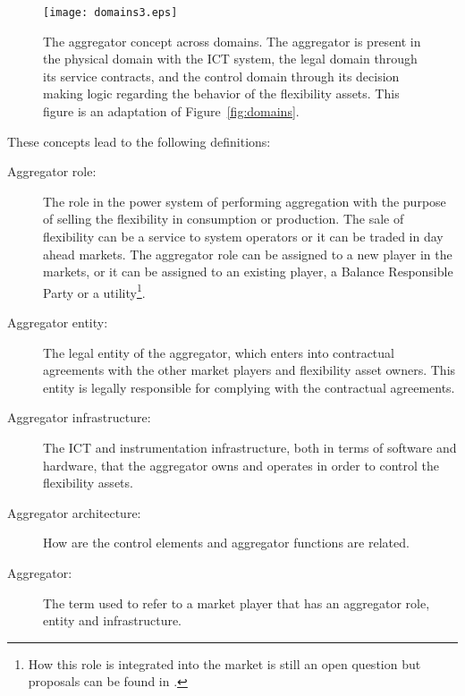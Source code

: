 \begin{figure}[htbp!]
\centering
\texttt{[image: domains3.eps]}
\caption{The aggregator concept across domains. The aggregator is present in the physical domain with the ICT system, the legal domain through its service contracts, and the control domain through its decision making logic regarding the behavior of the flexibility assets. This figure is an adaptation of Figure~\ref{fig:domains}.}
\label{fig:MAINdomains}
\end{figure}

These concepts lead to the following definitions:
\begin{description}
	\item[Aggregator role:] The role in the power system of performing aggregation with the purpose of selling the flexibility in consumption or production. The sale of flexibility can be a service to system operators or it can be traded in day ahead markets. The aggregator role can be assigned to a new player in the markets, or it can be assigned to an existing player, \eg a Balance Responsible Party or a utility\footnote{How this role is integrated into the market is still an open question but proposals can be found in \cite{usef2015,heussen2013a}.}.
	\item[Aggregator entity:] The legal entity of the aggregator, which enters into contractual agreements with the other market players and flexibility asset owners. This entity is legally responsible for complying with the contractual agreements.
	\item[Aggregator infrastructure:] The ICT and instrumentation infrastructure, both in terms of software and hardware, that the aggregator owns and operates in order to control the flexibility assets.%
	\item[Aggregator architecture:] How are the control elements and aggregator functions are related.%
	\item[Aggregator:] The term used to refer to a market player that has an aggregator role, entity and infrastructure.
\end{description}

